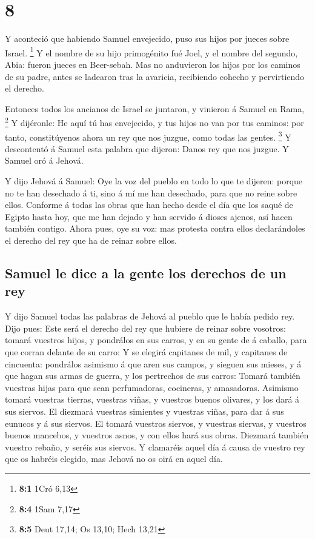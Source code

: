 \hypertarget{section-7}{%
\section{8}\label{section-7}}

 Y aconteció que habiendo Samuel envejecido, puso sus hijos
por jueces sobre Israel. \footnote{\textbf{8:1} 1Cró 6,13} 
Y el nombre de su hijo primogénito fué Joel, y el nombre del segundo,
Abia: fueron jueces en Beer-sebah.  Mas no anduvieron los
hijos por los caminos de su padre, antes se ladearon tras la avaricia,
recibiendo cohecho y pervirtiendo el derecho.

 Entonces todos los ancianos de Israel se juntaron, y
vinieron á Samuel en Rama, \footnote{\textbf{8:4} 1Sam 7,17}
 Y dijéronle: He aquí tú has envejecido, y tus hijos no van
por tus caminos: por tanto, constitúyenos ahora un rey que nos juzgue,
como todas las gentes. \footnote{\textbf{8:5} Deut 17,14; Os 13,10; Hech
  13,21}  Y descontentó á Samuel esta palabra que dijeron:
Danos rey que nos juzgue. Y Samuel oró á Jehová.

 Y dijo Jehová á Samuel: Oye la voz del pueblo en todo lo
que te dijeren: porque no te han desechado á ti, sino á mí me han
desechado, para que no reine sobre ellos.  Conforme á todas
las obras que han hecho desde el día que los saqué de Egipto hasta hoy,
que me han dejado y han servido á dioses ajenos, así hacen también
contigo.  Ahora pues, oye su voz: mas protesta contra ellos
declarándoles el derecho del rey que ha de reinar sobre ellos.

\hypertarget{samuel-le-dice-a-la-gente-los-derechos-de-un-rey}{%
\subsection{Samuel le dice a la gente los derechos de un
rey}\label{samuel-le-dice-a-la-gente-los-derechos-de-un-rey}}

 Y dijo Samuel todas las palabras de Jehová al pueblo que
le había pedido rey.  Dijo pues: Este será el derecho del
rey que hubiere de reinar sobre vosotros: tomará vuestros hijos, y
pondrálos en sus carros, y en su gente de á caballo, para que corran
delante de su carro:  Y se elegirá capitanes de mil, y
capitanes de cincuenta: pondrálos asimismo á que aren sus campos, y
sieguen sus mieses, y á que hagan sus armas de guerra, y los pertrechos
de sus carros:  Tomará también vuestras hijas para que sean
perfumadoras, cocineras, y amasadoras.  Asimismo tomará
vuestras tierras, vuestras viñas, y vuestros buenos olivares, y los dará
á sus siervos.  El diezmará vuestras simientes y vuestras
viñas, para dar á sus eunucos y á sus siervos.  El tomará
vuestros siervos, y vuestras siervas, y vuestros buenos mancebos, y
vuestros asnos, y con ellos hará sus obras.  Diezmará
también vuestro rebaño, y seréis sus siervos.  Y clamaréis
aquel día á causa de vuestro rey que os habréis elegido, mas Jehová no
os oirá en aquel día.

